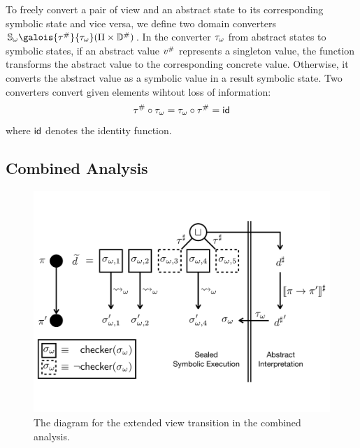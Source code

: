 To freely convert a pair of view and an abstract state to its corresponding
symbolic state and vice versa, we define two domain converters $\symbstset
\galois{\saconverter}{\asconverter} (\viewset \times \absdom)$.  In the
converter ${\tau}_\omega$ from abstract states to symbolic states, if an abstract
value ${v}^{\#}$ represents a singleton value, the function transforms the
abstract value to the corresponding concrete value.  Otherwise, it converts the
abstract value as a symbolic value in a result symbolic state.  Two converters
convert given elements wihtout loss of information:
\[
  {\tau}^{\#} \circ {\tau}_\omega = {\tau}_\omega \circ {\tau}^{\#} = \textsf{id}
\]
where $\textsf{id}$ denotes the identity function.


\subsection{Combined Analysis}

\begin{figure}[t]
  \centering
  \includegraphics[width=\linewidth]{img/combined-analysis}
  \vspace*{-2em}
  \caption{The diagram for the extended view transition in the combined analysis.}
  \vspace*{-1em}
  \label{fig:combined-analysis}
\end{figure}

